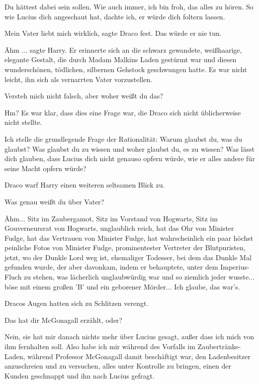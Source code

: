\glqq{}Du hättest dabei sein sollen. Wie auch immer, ich bin froh, das alles zu
hören. So wie Lucius dich angeschaut hat, dachte ich, er würde dich foltern
lassen.\grqq{}

\glqq{}Mein Vater liebt mich wirklich\grqq{}, sagte Draco fest. \glqq{}Das würde
er nie tun.\grqq{}

\glqq{}Ähm ...\grqq{} sagte Harry. Er erinnerte sich an die schwarz gewandete,
weißhaarige, elegante Gestalt, die durch Madam Malkins Laden gestürmt war und
diesen wunderschönen, tödlichen, silbernen Gehstock geschwungen hatte. Es war
nicht leicht, ihn sich als vernarrten Vater vorzustellen.

\glqq{}Versteh mich nicht falsch, aber woher weißt du das?\grqq{}

\glqq{}Hm?\grqq{} Es war klar, dass dies eine Frage war, die Draco sich nicht
üblicherweise nicht stellte.

\glqq{}Ich stelle die grundlegende Frage der Rationalität: Warum glaubst du, was
du glaubst? Was glaubst du zu wissen und woher glaubst du, es zu wissen? Was
lässt dich glauben, dass Lucius dich nicht genauso opfern würde, wie er alles
andere für seine Macht opfern würde?\grqq{}

Draco warf Harry einen weiteren seltsamen Blick zu.

\glqq{}Was genau weißt du über Vater?\grqq{}

\glqq{}Ähm... Sitz im Zaubergamot, Sitz im Vorstand von Hogwarts, Sitz im
Gouverneursrat von Hogwarts, unglaublich reich, hat das Ohr von Minister Fudge,
hat das Vertrauen von Minister Fudge, hat wahrscheinlich ein paar höchst
peinliche Fotos von Minister Fudge, prominentester Vertreter der Blutpuristen,
jetzt, wo der Dunkle Lord weg ist, ehemaliger Todesser, bei dem das Dunkle Mal
gefunden wurde, der aber davonkam, indem er behauptete, unter dem Imperius-Fluch
zu stehen, was lächerlich unglaubwürdig war und so ziemlich jeder wusste... böse
mit einem großen 'B' und ein geborener Mörder... Ich glaube, das war's.\grqq{}

Dracos Augen hatten sich zu Schlitzen verengt.

\glqq{}Das hat dir McGonagall erzählt, oder?\grqq{}

\glqq{}Nein, sie hat mir danach nichts mehr über Lucius gesagt, außer dass ich
mich von ihm fernhalten soll. Also habe ich mir während des Vorfalls im
Zaubertränke-Laden, während Professor McGonagall damit beschäftigt war, den
Ladenbesitzer anzuschreien und zu versuchen, alles unter Kontrolle zu bringen,
einen der Kunden geschnappt und ihn nach Lucius gefragt.\grqq{}

